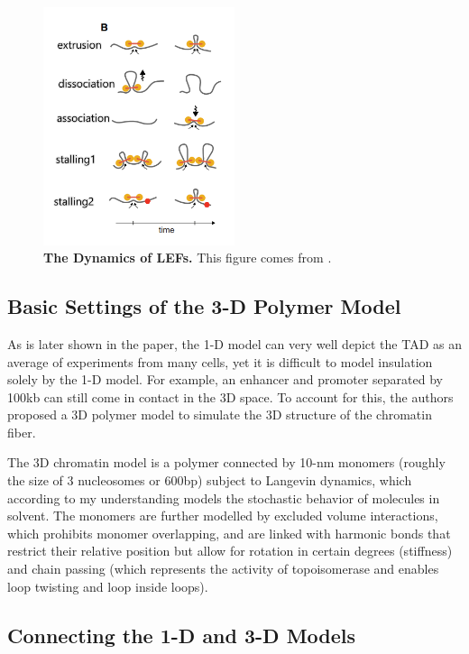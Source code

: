 \documentclass[11pt]{article}
\begin{document}
\begin{figure}[htbp]
  \centering
  \includegraphics[width=0.5\textwidth]{assets/image-20221212095109951.png}
  \caption{\textbf{The Dynamics of LEFs.} This figure comes from \cite{fudenberg_formation_2016}.}
  \label{fig:LEF dynamics}
\end{figure}

\subsection{Basic Settings of the 3-D Polymer Model}

As is later shown in the paper, the 1-D model can very well depict the TAD as an average of experiments from many cells, yet it is difficult to model insulation solely by the 1-D model. For example, an enhancer and promoter separated by 100kb can still come in contact in the 3D space. To account for this, the authors proposed a 3D polymer model to simulate the 3D structure of the chromatin fiber.

The 3D chromatin model is a polymer connected by 10-nm monomers (roughly the size of 3 nucleosomes or 600bp) subject to Langevin dynamics, which according to my understanding models the stochastic behavior of molecules in solvent. The monomers are further modelled by excluded volume interactions, which prohibits monomer overlapping, and are linked with harmonic bonds that restrict their relative position but allow for rotation in certain degrees (stiffness) and chain passing (which represents the activity of topoisomerase and enables loop twisting and loop inside loops).

\subsection{Connecting the 1-D and 3-D Models}
\end{document}
